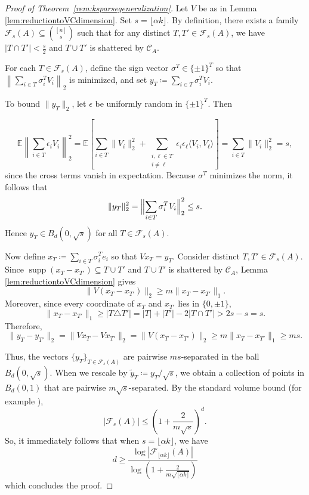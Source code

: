 \documentclass[preprint]{article}
\begin{document}
\begin{proof}[Proof of Theorem~\ref{rem:ksparsegeneralization}]
Let $V$ be as in Lemma \ref{lem:reductiontoVCdimension}. Set $s=\lfloor \alpha k\rfloor$. By definition, there exists a family $\mathcal{F}_s(A) \subseteq \binom{[n]}{s}$ such that for any distinct $T,T' \in \mathcal{F}_s(A)$, we have $|T\cap T'| < \frac{s}{2}$ and $T\cup T'$ is shattered by $\mathcal{C}_A$.

For each $T \in \mathcal{F}_s(A)$, define the sign vector $\sigma^T \in \{\pm 1\}^T$ so that $\left\|\sum_{i \in T} \sigma_i^T V_i\right\|_2$ is minimized, and set $y_T \coloneqq \sum_{i \in T} \sigma_i^T V_i$.

To bound $\|y_T\|_2$, let $\epsilon$ be uniformly random in $\{\pm 1\}^T$. Then


$$\mathbb{E}\left\|\sum_{i\in T}\epsilon_i V_i\right\|_2^2
=
\mathbb{E}\left[
\sum_{i\in T}\|V_i\|_2^2
+
\sum_{\substack{i,\ell\in T\\ i\neq \ell}}
\epsilon_i\epsilon_\ell \langle V_i,V_\ell\rangle
\right]
=
\sum_{i\in T}\|V_i\|_2^2
=
s,
$$
since the cross terms vanish in expectation. Because $\sigma^T$ minimizes the norm, it follows that
\[
\|y_T\|_2^2
=
\Bigl\|\sum_{i\in T}\sigma_i^T V_i\Bigr\|_2^2
\le s.
\]
Hence $y_T \in B_d(0,\sqrt{s})$ for all $T \in \mathcal{F}_s(A)$.

Now define $x_T \coloneqq \sum_{i \in T}\sigma_i^T e_i$ so that $Vx_T = y_T$. Consider distinct $T,T' \in \mathcal{F}_s(A)$. Since $\operatorname{supp}(x_T-x_{T'}) \subseteq T\cup T'$ and $T\cup T'$ is shattered by $\mathcal{C}_A$, Lemma \ref{lem:reductiontoVCdimension} gives
$$
\|V(x_T-x_{T'})\|_2 \ge m\|x_T-x_{T'}\|_1.
$$
Moreover, since every coordinate of $x_T$ and $x_{T'}$ lies in $\{0,\pm 1\}$,
$$
\|x_T-x_{T'}\|_1 \ge |T\triangle T'|
= |T|+|T'|-2|T\cap T'|
> 2s-s
= s.
$$
Therefore,
$$
\|y_T-y_{T'}\|_2
=
\|Vx_T - Vx_{T'}\|_2
=
\|V(x_T-x_{T'})\|_2
\ge m\|x_T-x_{T'}\|_1
\ge ms.
$$

Thus, the vectors $\{y_T\}_{T\in \mathcal{F}_s(A)}$ are pairwise $ms$-separated in the ball $B_d(0,\sqrt{s})$. When we rescale by $\tilde y_T \coloneqq y_T/\sqrt{s}$, we obtain a collection of points in $B_d(0,1)$ that are pairwise $m\sqrt{s}$-separated. By the standard volume bound (for example \cite[Corollary 4.2.11]{Vershynin2026}),
$$
|\mathcal{F}_s(A)| \le \left(1+\frac{2}{m\sqrt{s}}\right)^d.
$$
So, it immediately follows that when $s=\lfloor \alpha k\rfloor$, we have
$$
d \geq \frac{\log |\mathcal{F}_{\lfloor \alpha k\rfloor}(A)|}{\log\left(1+\frac{2}{m\sqrt{\lfloor \alpha k\rfloor}}\right)}$$
which concludes the proof.
\end{proof}
\end{document}
